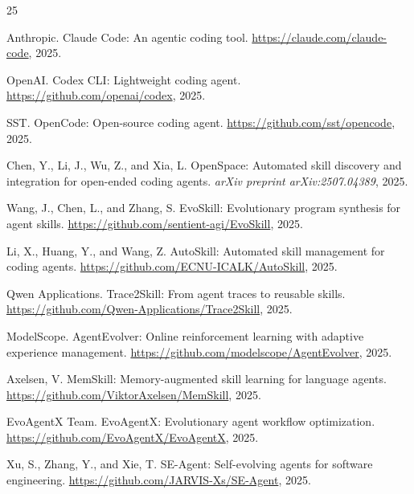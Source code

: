 \documentclass{article}
\begin{document}


\begin{thebibliography}{25}

Anthropic.
\newblock Claude Code: An agentic coding tool.
\newblock \url{https://claude.com/claude-code}, 2025.

OpenAI.
\newblock Codex CLI: Lightweight coding agent.
\newblock \url{https://github.com/openai/codex}, 2025.

SST.
\newblock OpenCode: Open-source coding agent.
\newblock \url{https://github.com/sst/opencode}, 2025.

Chen, Y., Li, J., Wu, Z., and Xia, L.
\newblock OpenSpace: Automated skill discovery and integration for open-ended coding agents.
\newblock \emph{arXiv preprint arXiv:2507.04389}, 2025.

Wang, J., Chen, L., and Zhang, S.
\newblock EvoSkill: Evolutionary program synthesis for agent skills.
\newblock \url{https://github.com/sentient-agi/EvoSkill}, 2025.

Li, X., Huang, Y., and Wang, Z.
\newblock AutoSkill: Automated skill management for coding agents.
\newblock \url{https://github.com/ECNU-ICALK/AutoSkill}, 2025.

Qwen Applications.
\newblock Trace2Skill: From agent traces to reusable skills.
\newblock \url{https://github.com/Qwen-Applications/Trace2Skill}, 2025.

ModelScope.
\newblock AgentEvolver: Online reinforcement learning with adaptive experience management.
\newblock \url{https://github.com/modelscope/AgentEvolver}, 2025.

Axelsen, V.
\newblock MemSkill: Memory-augmented skill learning for language agents.
\newblock \url{https://github.com/ViktorAxelsen/MemSkill}, 2025.

EvoAgentX Team.
\newblock EvoAgentX: Evolutionary agent workflow optimization.
\newblock \url{https://github.com/EvoAgentX/EvoAgentX}, 2025.

Xu, S., Zhang, Y., and Xie, T.
\newblock SE-Agent: Self-evolving agents for software engineering.
\newblock \url{https://github.com/JARVIS-Xs/SE-Agent}, 2025.


\end{thebibliography}
\end{document}
